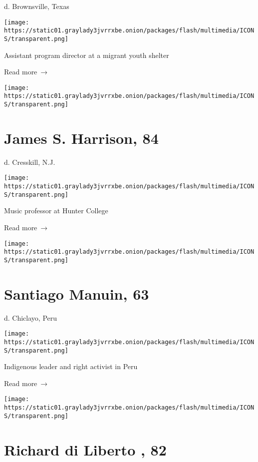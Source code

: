d. Brownsville, Texas

\texttt{[image: https://static01.graylady3jvrrxbe.onion/packages/flash/multimedia/ICONS/transparent.png]}

Assistant program director at a migrant youth shelter

 Read more~→

\href{https://www.nytimes3xbfgragh.onion/2020/07/09/obituaries/james-harrison-dead-coronavirus.html}{}

\texttt{[image: https://static01.graylady3jvrrxbe.onion/packages/flash/multimedia/ICONS/transparent.png]}

\hypertarget{james-s-harrison-84}{%
\section{James S. Harrison, 84}\label{james-s-harrison-84}}

d. Cresskill, N.J.

\texttt{[image: https://static01.graylady3jvrrxbe.onion/packages/flash/multimedia/ICONS/transparent.png]}

Music professor at Hunter College

 Read more~→

\href{https://www.nytimes3xbfgragh.onion/2020/07/08/world/americas/santiago-manuin-dead-coronavirus.html}{}

\texttt{[image: https://static01.graylady3jvrrxbe.onion/packages/flash/multimedia/ICONS/transparent.png]}

\hypertarget{santiago-manuin-63}{%
\section{Santiago Manuin, 63}\label{santiago-manuin-63}}

d. Chiclayo, Peru

\texttt{[image: https://static01.graylady3jvrrxbe.onion/packages/flash/multimedia/ICONS/transparent.png]}

Indigenous leader and right activist in Peru

 Read more~→

\href{https://www.nytimes3xbfgragh.onion/2020/07/07/obituaries/richard-di-liberto-dead-coronavirus.html}{}

\texttt{[image: https://static01.graylady3jvrrxbe.onion/packages/flash/multimedia/ICONS/transparent.png]}

\hypertarget{richard-di-liberto--82}{%
\section{Richard di Liberto , 82}\label{richard-di-liberto--82}}

